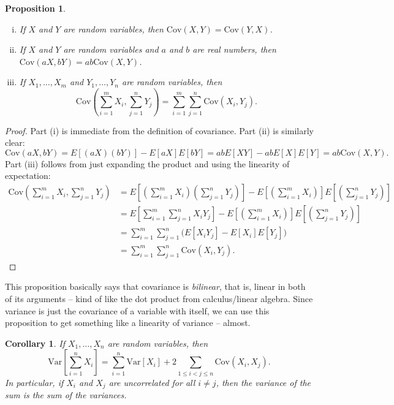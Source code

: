 \documentclass[12pt]{article}
\theoremstyle{plain}
\newtheorem{proposition}[theorem]{Proposition}
\newtheorem{corollary}[theorem]{Corollary}
\theoremstyle{definition}
\theoremstyle{remark}
\newcommand{\Var}{\ensuremath{\textrm{Var}}}
\newcommand{\Cov}{\ensuremath{\textrm{Cov}}}
\begin{document}
\begin{proposition}
    \begin{enumerate}[(i)]
        \item If $X$ and $Y$ are random variables, then $\Cov(X, Y) = \Cov(Y,X)$.
        \item If $X$ and $Y$ are random variables and $a$ and $b$ are real numbers, then $\Cov(aX, bY) = ab\Cov(X,Y)$.
        \item If $X_1, \ldots, X_m$ and $Y_1, \ldots, Y_n$ are random variables, then
        \[
            \Cov\left(\sum_{i=1}^m X_i, \sum_{j=1}^nY_j\right) = \sum_{i=1}^m\sum_{j=1}^n\Cov(X_i, Y_j).
        \]
    \end{enumerate}
\end{proposition}
\begin{proof}
    Part (i) is immediate from the definition of covariance.
    Part (ii) is similarly clear:
    \[
        \Cov(aX, bY) = E[(aX)(bY)] -E[aX]E[bY] = abE[XY]-abE[X]E[Y] = ab\Cov(X,Y).
    \]
    Part (iii) follows from just expanding the product and using the linearity of expectation:
    \begin{align*}
        \Cov\left(\sum_{i=1}^m X_i, \sum_{j=1}^nY_j\right) &= E\left[\left(\sum_{i=1}^m X_i\right)\left( \sum_{j=1}^nY_j\right)\right] - E\left[\left(\sum_{i=1}^m X_i\right)\right]E\left[\left(\sum_{j=1}^n Y_j\right)\right]\\
        &= E\left[\sum_{i=1}^m\sum_{j=1}^nX_iY_j\right] - E\left[\left(\sum_{i=1}^m X_i\right)\right]E\left[\left(\sum_{j=1}^n Y_j\right)\right]\\
        &= \sum_{i=1}^m\sum_{j=1}^n\big(E[X_iY_j] - E[X_i]E[Y_j]\big)\\
        &= \sum_{i=1}^m\sum_{j=1}^n\Cov(X_i, Y_j).
    \end{align*}
\end{proof}

This proposition basically says that covariance is \emph{bilinear}, that is, linear in both of its arguments -- kind of like the dot product from calculus/linear algebra.
Since variance is just the covariance of a variable with itself, we can use this proposition to get something like a linearity of variance -- almost.
\begin{corollary}
    If $X_1, \ldots, X_n$ are random variables, then
    \[
        \Var\left[\sum_{i=1}^nX_i\right] = \sum_{i=1}^n\Var[X_i] + 2\sum_{1\leq i<j\leq n}\Cov(X_i, X_j).
    \]
    In particular, if $X_i$ and $X_j$ are uncorrelated for all $i\neq j$, then the variance of the sum is the sum of the variances.
\end{corollary}
\end{document}
